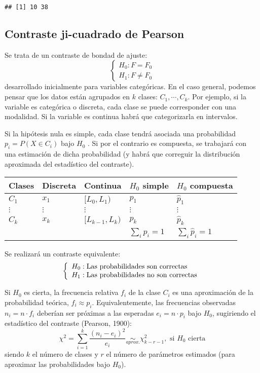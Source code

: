 \documentclass[
]{book}
\theoremstyle{break}
\theoremstyle{definition}
\theoremstyle{definition}
\theoremstyle{definition}
\theoremstyle{remark}
\begin{document}
\begin{verbatim}
## [1] 10 38
\end{verbatim}

\hypertarget{chi2test}{%
\subsection{Contraste ji-cuadrado de Pearson}\label{chi2test}}

Se trata de un contraste de bondad de ajuste:
\[\left \{
\begin{array}{l}
H_0:F=F_0\\
H_1:F\neq F_0\end{array}
\right.\]
desarrollado inicialmente para variables categóricas. En el caso general, podemos pensar que los datos están agrupados en \(k\) clases: \(C_1,\cdots,C_{k}\). Por ejemplo, si la variable es categórica o discreta, cada clase se puede corresponder con una modalidad. Si la variable es continua habrá que categorizarla en intervalos.

Si la hipótesis nula es simple, cada clase tendrá asociada una probabilidad \(p_{i}=P\left( X\in C_{i} \right)\) bajo \(H_0\) . Si por el contrario es compuesta, se trabajará con una estimación de dicha probabilidad (y habrá que correguir la distribución aproximada del estadístico del contraste).

\begin{longtable}[]{@{}lllll@{}}
\toprule
Clases & Discreta & Continua & \(H_0\) simple & \(H_0\) compuesta\tabularnewline
\midrule
\endhead
\(C_1\) & \(x_1\) & \([L_0,L_1)\) & \(p_1\) & \(\hat{p}_1\)\tabularnewline
\(\vdots\) & \(\vdots\) & \(\vdots\) & \(\vdots\) & \(\vdots\)\tabularnewline
\(C_{k}\) & \(x_{k}\) & \([L_{k-1},L_{k})\) & \(p_{k}\) & \(\hat{p}_{k}\)\tabularnewline
& & & \(\sum_{i}p_{i}=1\) & \(\sum_{i}\hat{p}_{i}=1\)\tabularnewline
\bottomrule
\end{longtable}

Se realizará un contraste equivalente:
\[\left\{ \begin{array}[c]{l}
H_0:\text{Las probabilidades son correctas}\\
H_1:\text{Las probabilidades no son correctas}
\end{array} \right.\]

Si \(H_0\) es cierta, la frecuencia relativa \(f_{i}\) de la clase \(C_{i}\) es una aproximación de la probabilidad teórica, \(f_{i}\approx p_{i}\).
Equivalentemente, las frecuencias observadas \(n_{i}=n\cdot f_{i}\) deberían ser próximas a las esperadas \(e_{i}=n\cdot p_{i}\) bajo \(H_0\), sugiriendo el estadístico del contraste (Pearson, 1900):
\[\chi^2=\sum_{i=1}^{k}\frac{(n_{i}-e_{i})^2}{e_{i}}\underset{aprox.}{\sim
}\chi_{k-r-1}^2,\text{ si }H_0\text{ cierta}\]
siendo \(k\) el número de clases y \(r\) el número de parámetros estimados (para aproximar las probabilidades bajo \(H_0\)).
\end{document}
